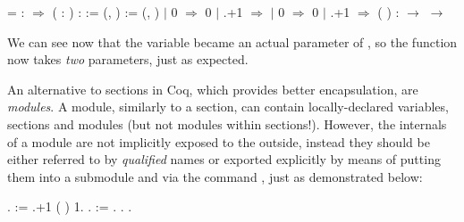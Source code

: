 \coqdoceol
\coqdocemptyline
\coqdocnoindent
{} = \coqdoceol
\coqdocnoindent
{}  :  \ensuremath{\Rightarrow}\coqdoceol
\coqdocnoindent
{}  ( : ) :  :=\coqdoceol
\coqdocindent{1.00em}
 (, ) := (, ) \coqdoceol
\coqdocindent{1.00em}
  \coqdoceol
\coqdocindent{1.00em}
\ensuremath{|} 0 \ensuremath{\Rightarrow} 0\coqdoceol
\coqdocindent{1.00em}
\ensuremath{|} \coqdocvar{\_}.+1 \ensuremath{\Rightarrow}   \coqdoceol
\coqdocindent{6.00em}
\ensuremath{|} 0 \ensuremath{\Rightarrow} 0\coqdoceol
\coqdocindent{6.00em}
\ensuremath{|} .+1 \ensuremath{\Rightarrow}  ( ) \coqdoceol
\coqdocindent{6.00em}
\coqdoceol
\coqdocindent{1.00em}
\coqdoceol
\coqdocindent{2.50em}
:  \ensuremath{\rightarrow}  \ensuremath{\rightarrow} 

\coqdocemptyline


We can see now that the variable  became an actual parameter of
, so the function now takes \textit{two} parameters, just as
expected.


An alternative to sections in Coq, which provides better
encapsulation, are \textit{modules}. A module,  similarly to a
section, can contain locally-declared variables, sections and modules
(but not modules within sections!). However, the internals of a module
are not implicitly exposed to the outside, instead they should be
either referred to by \textit{qualified} names or exported explicitly by
means of putting them into a submodule and via the command
, just as demonstrated below:


\begin{coqdoccode}
\coqdocemptyline
\coqdocnoindent
{} .\coqdoceol
\coqdocemptyline
\coqdocnoindent
{}   :=\coqdoceol
\coqdocindent{1.00em}
   .+1    ( )  1.\coqdoceol
\coqdocemptyline
\coqdocnoindent
{} .\coqdoceol
\coqdocnoindent
{}  := .\coqdoceol
\coqdocnoindent
{} .\coqdoceol
\coqdocemptyline
\coqdocnoindent
{} .\coqdoceol
\coqdocemptyline
\end{coqdoccode}



